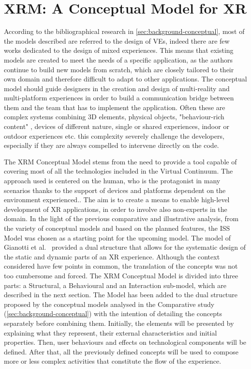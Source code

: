 \chapter{XRM: A Conceptual Model for XR}
\label{ch:conceptual-model}

According to the bibliographical research in \autoref{sec:background-conceptual}, most of the models described are referred to the design of VEs, indeed there are few works dedicated to the design of mixed experiences. This means that existing models are created to meet the needs of a specific application, as the authors continue to build new models from scratch, which are closely tailored to their own domain and therefore difficult to adapt to other applications. The conceptual model should guide designers in the creation and design of multi-reality and multi-platform experiences in order to build a communication bridge between them and the team that has to implement the application. Often these are complex systems combining 3D elements, physical objects, "behaviour-rich content" \cite{walczak_structured_2008}, devices of different nature, single or shared experiences, indoor or outdoor experiences etc. this complexity severely challenge the developers, especially if they are always compelled to intervene directly on the code. 

The XRM Conceptual Model stems from the need to provide a tool capable of covering most of all the technologies included in the Virtual Continuum. The approach used is centered on the human, who is the protagonist in many scenarios thanks to the support of devices and platforms dependent on the environment experienced.. The aim is to create a means to enable high-level development of XR applications, in order to involve also non-experts in the domain. 
In the light of the previous comparative and illustrative analysis, from the variety of conceptual models and based on the planned features, the ISS Model was chosen as a starting point for the upcoming model. The model of Gianotti et al.~\cite{dobbie_modeling_2020} provided a dual structure that allows for the systematic design of the static and dynamic parts of an XR experience. Although the context considered have few points in common, the translation of the concepts was not too cumbersome and forced. The XRM Conceptual Model is divided into three parts: a Structural, a Behavioural and an Interaction sub-model, which are described in the next section. 
The Model has been added to the dual structure proposed by the conceptual models analysed in the Comparative study (\autoref{sec:background-conceptual}) with the intention of detailing the concepts separately before combining them. Initially, the elements will be presented by explaining what they represent, their external characteristics and initial properties. Then, user behaviours and effects on technological components will be defined. After that, all the previously defined concepts will be used to compose more or less complex activities that constitute the flow of the experience.





